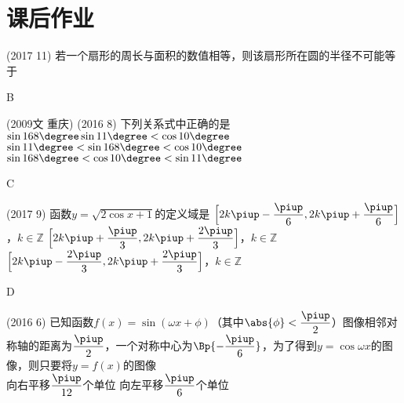 \section{课后作业}
  \begin{exercise}
    \item%
      (2017  11)
      若一个扇形的周长与面积的数值相等，则该扇形所在圆的半径不可能等于\xz
      \begin{answer}
        B
      \end{answer}
    \item%
      {\kaishu (2009文 \textbullet 重庆)}
      (2016  8)
      下列关系式中正确的是\xz
       {$\sin168\degree\sin11\degree<\cos10\degree$}
       {$\sin11\degree<\sin168\degree<\cos10\degree$}
       {$\sin168\degree<\cos10\degree<\sin11\degree$}
      \begin{answer}
        C
      \end{answer}
    \item%
      (2017  9)
      函数$y=\sqrt{2\cos x+1}$的定义域是\xz
       {$\Bigl[2k\piup-\dfrac{\piup}6,2k\piup+\dfrac{\piup}6 \Bigr]$，$k\in\mathbb{Z}$}
       {$\Bigl[2k\piup+\dfrac{\piup}3,2k\piup+\dfrac{2\piup}3 \Bigr]$，$k\in\mathbb{Z}$}
       {$\Bigl[2k\piup-\dfrac{2\piup}3,2k\piup+\dfrac{2\piup}3 \Bigr]$，$k\in\mathbb{Z}$}
      \begin{answer}
        D
      \end{answer}
    \item%
      (2016  6)
      已知函数$f(x)=\sin(\omega x+\phi)$（其中$\abs{\phi}<\dfrac{\piup}2$）图像相邻对称轴的距离为$\dfrac{\piup}2$，一个对称中心为$\Bp{-\dfrac{\piup}6}$，为了得到$y=\cos\omega x$的图像，则只要将$y=f(x)$的图像\xz\\
       {向右平移$\dfrac{\piup}{12}$个单位}
       {向左平移$\dfrac{\piup}6$个单位}

\end{exercise}

